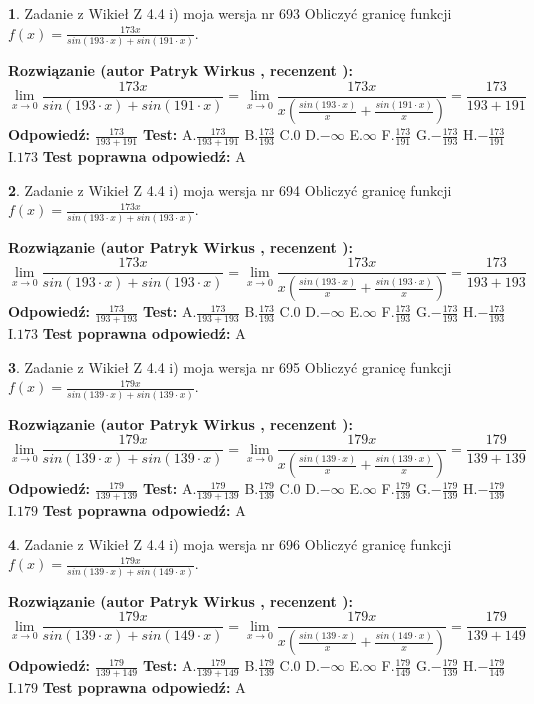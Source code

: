 \documentclass[12pt, a4paper]{article}
\theoremstyle{definition} %
\newtheorem{zad}{}
\newcommand{\zadStart}[1]{\begin{zad}#1\newline}
\newcommand{\zadStop}{\end{zad}}
\newcommand{\rozwStart}[2]{\noindent \textbf{Rozwiązanie (autor #1 , recenzent #2): }\newline}
\newcommand{\rozwStop}{\newline}
\newcommand{\odpStart}{\noindent \textbf{Odpowiedź:}\newline}
\newcommand{\odpStop}{\newline}
\newcommand{\testStart}{\noindent \textbf{Test:}\newline}
\newcommand{\testStop}{\newline}
\newcommand{\kluczStart}{\noindent \textbf{Test poprawna odpowiedź:}\newline}
\newcommand{\kluczStop}{\newline}
\begin{document}
\zadStart{Zadanie z Wikieł Z 4.4 i) moja wersja nr 693}
Obliczyć granicę funkcji $f(x)=\frac{173x}{sin(193\cdot x) +sin(191\cdot x)}$.
\zadStop
\rozwStart{Patryk Wirkus}{}
$$\lim\limits_{x\to 0}\frac{173x}{sin(193\cdot x) +sin(191\cdot x)}=\lim\limits_{x\to 0}\frac{173x}{x(\frac{sin(193\cdot x)}{x}+\frac{sin(191\cdot x)}{x})}=\frac{173}{193+191}$$
\rozwStop
\odpStart
$\frac{173}{193+191}$
\odpStop
\testStart
A.$\frac{173}{193+191}$
B.$\frac{173}{193}$
C.$0$
D.$-\infty$
E.$\infty$
F.$\frac{173}{191}$
G.$-\frac{173}{193}$
H.$-\frac{173}{191}$
I.$173$
\testStop
\kluczStart
A
\kluczStop



\zadStart{Zadanie z Wikieł Z 4.4 i) moja wersja nr 694}
Obliczyć granicę funkcji $f(x)=\frac{173x}{sin(193\cdot x) +sin(193\cdot x)}$.
\zadStop
\rozwStart{Patryk Wirkus}{}
$$\lim\limits_{x\to 0}\frac{173x}{sin(193\cdot x) +sin(193\cdot x)}=\lim\limits_{x\to 0}\frac{173x}{x(\frac{sin(193\cdot x)}{x}+\frac{sin(193\cdot x)}{x})}=\frac{173}{193+193}$$
\rozwStop
\odpStart
$\frac{173}{193+193}$
\odpStop
\testStart
A.$\frac{173}{193+193}$
B.$\frac{173}{193}$
C.$0$
D.$-\infty$
E.$\infty$
F.$\frac{173}{193}$
G.$-\frac{173}{193}$
H.$-\frac{173}{193}$
I.$173$
\testStop
\kluczStart
A
\kluczStop



\zadStart{Zadanie z Wikieł Z 4.4 i) moja wersja nr 695}
Obliczyć granicę funkcji $f(x)=\frac{179x}{sin(139\cdot x) +sin(139\cdot x)}$.
\zadStop
\rozwStart{Patryk Wirkus}{}
$$\lim\limits_{x\to 0}\frac{179x}{sin(139\cdot x) +sin(139\cdot x)}=\lim\limits_{x\to 0}\frac{179x}{x(\frac{sin(139\cdot x)}{x}+\frac{sin(139\cdot x)}{x})}=\frac{179}{139+139}$$
\rozwStop
\odpStart
$\frac{179}{139+139}$
\odpStop
\testStart
A.$\frac{179}{139+139}$
B.$\frac{179}{139}$
C.$0$
D.$-\infty$
E.$\infty$
F.$\frac{179}{139}$
G.$-\frac{179}{139}$
H.$-\frac{179}{139}$
I.$179$
\testStop
\kluczStart
A
\kluczStop



\zadStart{Zadanie z Wikieł Z 4.4 i) moja wersja nr 696}
Obliczyć granicę funkcji $f(x)=\frac{179x}{sin(139\cdot x) +sin(149\cdot x)}$.
\zadStop
\rozwStart{Patryk Wirkus}{}
$$\lim\limits_{x\to 0}\frac{179x}{sin(139\cdot x) +sin(149\cdot x)}=\lim\limits_{x\to 0}\frac{179x}{x(\frac{sin(139\cdot x)}{x}+\frac{sin(149\cdot x)}{x})}=\frac{179}{139+149}$$
\rozwStop
\odpStart
$\frac{179}{139+149}$
\odpStop
\testStart
A.$\frac{179}{139+149}$
B.$\frac{179}{139}$
C.$0$
D.$-\infty$
E.$\infty$
F.$\frac{179}{149}$
G.$-\frac{179}{139}$
H.$-\frac{179}{149}$
I.$179$
\testStop
\kluczStart
A
\kluczStop
\end{document}
